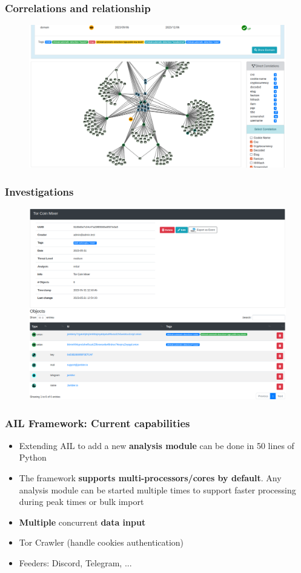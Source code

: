 \documentclass{beamer}
\begin{document}
\begin{frame}
    \frametitle{Correlations and relationship}
    \begin{figure}
        \includegraphics[scale=0.23, angle=0]{screenshot/ail-correlation.png}
    \end{figure}
\end{frame}


\begin{frame}
    \frametitle{Investigations}
    \begin{figure}
        \includegraphics[scale=0.22, angle=0]{screenshot/investigation_mixer.png}
    \end{figure}
\end{frame}

\begin{frame}
    \frametitle{AIL Framework: Current capabilities}
    \begin{itemize}
        \item Extending AIL to add a new {\bf analysis module} can be done in 50 lines of Python
        \item The framework {\bf supports multi-processors/cores by default}. Any analysis module can be started multiple times to support faster processing during peak times or bulk import
        \item \textbf{Multiple} concurrent \textbf{data input}
        \item Tor Crawler (handle cookies authentication)
        \item Feeders: Discord, Telegram, ...
    \end{itemize}
\end{frame}
\end{document}
